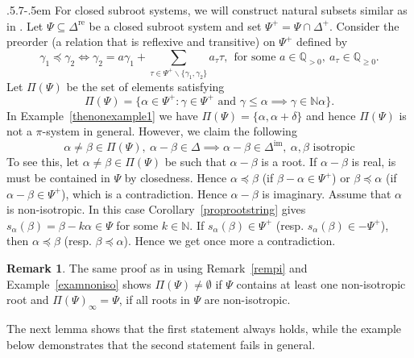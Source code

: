 \documentclass[11pt,reqno]{amsart}
\makeatletter
\theoremstyle{plain}
\theoremstyle{definition}
\newtheorem*{rem}{Remark}
\theoremstyle{remark}
\newcommand\bn{\mathbb N}
\numberwithin{equation}{section}
\def\subsection{\def\@secnumfont{\bfseries}\@startsection{subsection}{2}%
  {\parindent}{.5\linespacing\@plus.7\linespacing}{-.5em}%
  {\normalfont\bfseries}}
\makeatother
\begin{document}
\subsection{} For closed subroot systems, we will construct natural subsets similar as in \cite{deodhar1989note}. Let $\Psi\subseteq \Delta^{\mathrm{re}}$ be a closed subroot system and set $\Psi^+=\Psi\cap\Delta^+.$ Consider the preorder (a relation that is reflexive and transitive) on $\Psi^+$ defined by
    $$\gamma_1\preceq \gamma_2 \iff \gamma_2=a\gamma_1+\sum_{\tau\in \Psi^+\backslash{\{\gamma_1,\gamma_2\}}}a_{\tau}\tau,\ \ \text{for some } a\in \mathbb{Q}_{>0},\ a_{\tau}\in\mathbb{Q}_{\geq 0}.$$
Let $\Pi(\Psi)$ be the set of elements satisfying $$\Pi(\Psi)=\{\alpha\in \Psi^+: \gamma\in \Psi^+\text{ and } \gamma\le \alpha\implies \gamma\in \bn\alpha\}.$$
In Example~\ref{thenonexample1} we have $\Pi(\Psi)=\{\alpha,\alpha+\delta\}$ and hence $\Pi(\Psi)$ is not a $\pi$-system in general.
However, we claim the following
\begin{equation}\label{weakpisystem}
\alpha\neq \beta\in\Pi(\Psi),\ \alpha-\beta\in\Delta\implies \alpha-\beta\in \Delta^{\mathrm{im}},\ \text{$\alpha,\beta$ isotropic}
\end{equation}
To see this, let $\alpha\neq \beta\in\Pi(\Psi)$ be such that $\alpha-\beta$ is a root. If $\alpha-\beta$ is real, is must be contained in $\Psi$ by closedness. Hence $\alpha\preceq \beta$ (if $\beta-\alpha\in \Psi^+$) or $\beta\preceq \alpha$ (if $\alpha-\beta\in \Psi^+$), which is a contradiction. Hence $\alpha-\beta$ is imaginary. Assume that $\alpha$ is non-isotropic. In this case 
Corollary~\ref{proprootstring} gives $s_\alpha(\beta)=\beta-k\alpha\in \Psi$ for some $k\in \bn$. If $s_\alpha(\beta)\in \Psi^+$ (resp. $s_\alpha(\beta)\in -\Psi^+$), then $\alpha\preceq\beta$ (resp. $\beta\preceq \alpha$). Hence we get once more a contradiction.
\begin{rem}\label{remdeodhar}
    The same proof as in \cite[Section 3]{deodhar1989note} using Remark~\ref{rempi} and Example~\ref{examnoniso} shows $\Pi(\Psi)\neq \emptyset$ if $\Psi$ contains at least one non-isotropic root and $\Pi(\Psi)_\infty=\Psi$, if all roots in $\Psi$ are non-isotropic.
\end{rem}
The next lemma shows that the first statement always holds, while the example below demonstrates that the second statement fails in general.
\end{document}
